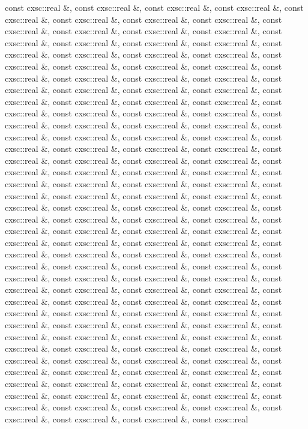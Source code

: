 \begin{DoxyCompactItemize}
const cxsc\-::real \&, const cxsc\-::real \&, const cxsc\-::real \&, const cxsc\-::real \&, const cxsc\-::real \&, const cxsc\-::real \&, const cxsc\-::real \&, const cxsc\-::real \&, const cxsc\-::real \&, const cxsc\-::real \&, const cxsc\-::real \&, const cxsc\-::real \&, const cxsc\-::real \&, const cxsc\-::real \&, const cxsc\-::real \&, const cxsc\-::real \&, const cxsc\-::real \&, const cxsc\-::real \&, const cxsc\-::real \&, const cxsc\-::real \&, const cxsc\-::real \&, const cxsc\-::real \&, const cxsc\-::real \&, const cxsc\-::real \&, const cxsc\-::real \&, const cxsc\-::real \&, const cxsc\-::real \&, const cxsc\-::real \&, const cxsc\-::real \&, const cxsc\-::real \&, const cxsc\-::real \&, const cxsc\-::real \&, const cxsc\-::real \&, const cxsc\-::real \&, const cxsc\-::real \&, const cxsc\-::real \&, const cxsc\-::real \&, const cxsc\-::real \&, const cxsc\-::real \&, const cxsc\-::real \&, const cxsc\-::real \&, const cxsc\-::real \&, const cxsc\-::real \&, const cxsc\-::real \&, const cxsc\-::real \&, const cxsc\-::real \&, const cxsc\-::real \&, const cxsc\-::real \&, const cxsc\-::real \&, const cxsc\-::real \&, const cxsc\-::real \&, const cxsc\-::real \&, const cxsc\-::real \&, const cxsc\-::real \&, const cxsc\-::real \&, const cxsc\-::real \&, const cxsc\-::real \&, const cxsc\-::real \&, const cxsc\-::real \&, const cxsc\-::real \&, const cxsc\-::real \&, const cxsc\-::real \&, const cxsc\-::real \&, const cxsc\-::real \&, const cxsc\-::real \&, const cxsc\-::real \&, const cxsc\-::real \&, const cxsc\-::real \&, const cxsc\-::real \&, const cxsc\-::real \&, const cxsc\-::real \&, const cxsc\-::real \&, const cxsc\-::real \&, const cxsc\-::real \&, const cxsc\-::real \&, const cxsc\-::real \&, const cxsc\-::real \&, const cxsc\-::real \&, const cxsc\-::real \&, const cxsc\-::real \&, const cxsc\-::real \&, const cxsc\-::real \&, const cxsc\-::real \&, const cxsc\-::real \&, const cxsc\-::real \&, const cxsc\-::real \&, const cxsc\-::real \&, const cxsc\-::real \&, const cxsc\-::real \&, const cxsc\-::real \&, const cxsc\-::real \&, const cxsc\-::real \&, const cxsc\-::real \&, const cxsc\-::real \&, const cxsc\-::real \&, const cxsc\-::real \&, const cxsc\-::real \&, const cxsc\-::real \&, const cxsc\-::real \&, const cxsc\-::real \&, const cxsc\-::real \&, const cxsc\-::real \&, const cxsc\-::real \&, const cxsc\-::real \&, const cxsc\-::real \&, const cxsc\-::real \&, const cxsc\-::real \&, const cxsc\-::real \&, const cxsc\-::real \&, const cxsc\-::real \&, const cxsc\-::real \&, const cxsc\-::real \&, const cxsc\-::real \&, const cxsc\-::real \&, const cxsc\-::real \&, const cxsc\-::real \&, const cxsc\-::real \&, const cxsc\-::real \&, const cxsc\-::real \&, const cxsc\-::real \&, const cxsc\-::real \&, const cxsc\-::real \&, const cxsc\-::real \&, const cxsc\-::real \&, const cxsc\-::real \&, const cxsc\-::real \&, const cxsc\-::real \&, const cxsc\-::real \&, const cxsc\-::real \&, const cxsc\-::real \&, const cxsc\-::real \&, const cxsc\-::real \&, const cxsc\-::real \&, const cxsc\-::real \&, const cxsc\-::real \&, const cxsc\-::real \&, const cxsc\-::real \&, const cxsc\-::real \&, const cxsc\-::real \&, const cxsc\-::real \&, const cxsc\-::real \&, const cxsc\-::real \&, const cxsc\-::real \&, const cxsc\-::real 
\end{DoxyCompactItemize}
